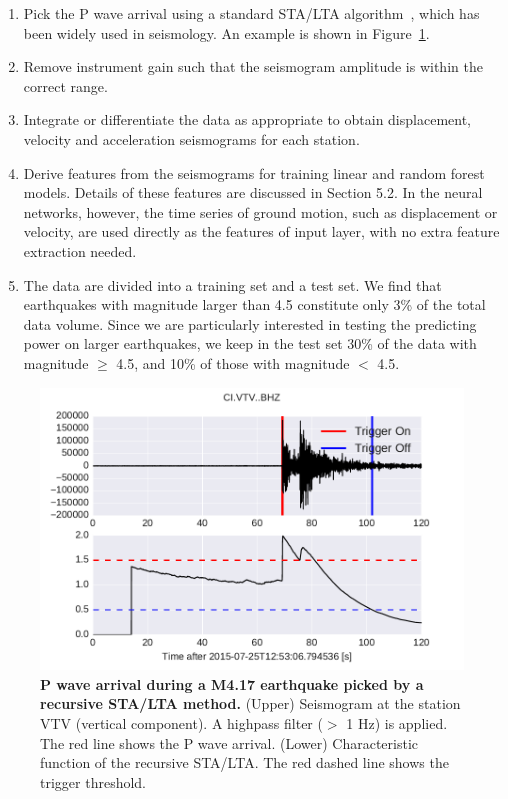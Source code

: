 \documentclass{article} %
\begin{document}
\begin{enumerate}
\item Pick the P wave arrival using a standard STA/LTA algorithm~\cite{Withers1998}, which has been widely used in seismology. An example is shown in Figure~\ref{sta_lta}. 
\item Remove instrument gain such that the seismogram amplitude is within the correct range.
\item Integrate or differentiate the data as appropriate to obtain displacement, velocity and acceleration seismograms for each station.
\item Derive features from the seismograms for training linear and random forest models. Details of these features are discussed in Section 5.2.  In the neural networks, however, the time series of ground motion, such as displacement or velocity, are used directly as the features of input layer, with no extra feature extraction needed.

\item The data are divided into a training set and a test set. We find that earthquakes with magnitude larger than 4.5 constitute only 3\% of the total data volume. Since we are particularly interested in testing the predicting power on larger earthquakes, we keep in the test set 30\% of the data with magnitude $\geq$ 4.5, and 10\% of those with magnitude $<$ 4.5.

\end{enumerate}

\begin{figure}[ht!]
	\centering
	\includegraphics*[scale=0.5, viewport= -55mm 0mm 500mm 100mm, angle=0]{./figure/sta_lta.pdf}
	\caption{{\bf P wave arrival during a M4.17 earthquake picked by a recursive STA/LTA method.} (Upper) Seismogram at the station VTV (vertical component). A highpass filter ($>$ 1 Hz) is applied. The red line shows the P wave arrival. (Lower) Characteristic function of the recursive STA/LTA. The red dashed line shows the trigger threshold.}\label{sta_lta} %
\end{figure}
\end{document}
